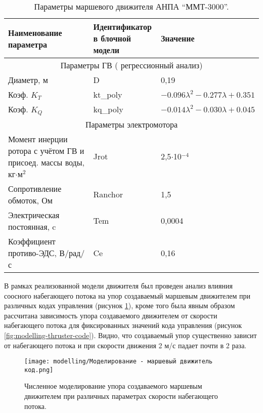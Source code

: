\begin{table}
    \caption{Параметры маршевого движителя АНПА ``ММТ-3000''.}
    \label{tab:modelling-thruster}
    \centering
    \begin{tabular}{lll}
        \toprule
        \makecell[l]{Наименование \\ параметра} & \makecell[l]{Идентификатор \\ в блочной модели} & Значение \\
        \midrule
        \multicolumn{3}{c}{Параметры ГВ ( регрессионный анализ)} \\
        \midrule
        Диаметр, м  & D & 0,19\\
        Коэф. $K_T$ & kt\_poly & $-0.096\lambda^2 -0.277\lambda + 0.351$\\
        Коэф. $K_Q$ & kq\_poly & $-0.014\lambda^2 -0.030\lambda + 0.045$\\
        \midrule
        \multicolumn{3}{c}{Параметры электромотора} \\
        \midrule
        \makecell[l]{Момент инерции ротора \\
        с учётом ГВ и присоед. \\ массы воды, кг$\cdot$м$^2$} & Jrot & 2,5$\cdot$10$^{-4}$ \\
        Сопротивление обмоток, Ом & Ranchor & 1,5 \\
        Электрическая постоянная, c & Tem & 0,0004 \\
        \makecell[l]{Коэффициент \\ 
        противо-ЭДС, В/рад/с} & Ce & 0,16 \\
        \bottomrule
    \end{tabular}
\end{table}

В рамках реализованной модели движителя был проведен анализ влияния соосного набегающего потока на упор создаваемый маршевым движителем при различных кодах управления (рисунок \ref{fig:modelling-thruster-velocity}), кроме того была явным образом рассчитана зависимость упора создаваемого движителем от скорости набегающего потока для фиксированных значений кода управления (рисунок \ref{fig:modelling-thruster-code}).
Видно, что создаваемый упор существенно зависит от набегающего потока и при скорости движения 2 м/с падает почти в 2 раза.

\begin{figure}[ht]
    \centering
    \texttt{[image: modelling/Моделирование - маршевый движитель код.png]}
    \caption{Численное моделирование упора создаваемого маршевым движителем при различных параметрах скорости набегающего потока.}
    \label{fig:modelling-thruster-velocity}
\end{figure}

